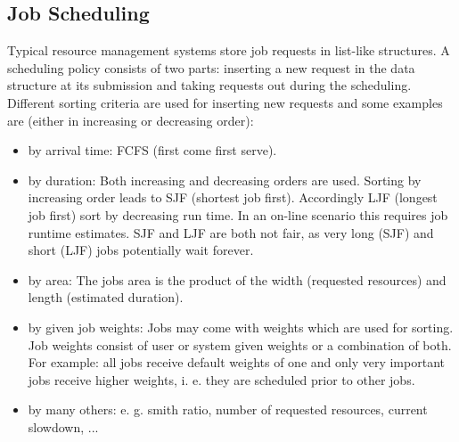 \subsection{Job Scheduling}
Typical resource management systems store job requests in list-like structures. A scheduling policy consists of two parts: inserting a new request in the data structure at its submission and taking requests out during the scheduling. Different sorting criteria are used for inserting new requests and some examples are (either in increasing or decreasing order):
\begin{itemize}
\item by arrival time: FCFS (first come first serve). 
\item by duration: Both increasing and decreasing orders are used. Sorting by increasing order leads to SJF (shortest job first). Accordingly LJF (longest job first) sort by decreasing run time. In an on-line scenario this requires job runtime estimates. SJF and LJF are both not fair, as very long (SJF) and short (LJF) jobs potentially wait forever.
\item by area: The jobs area is the product of the width (requested resources) and length (estimated duration). 
\item by given job weights: Jobs may come with weights which are used for sorting. Job weights consist of user or system given weights or a combination of both. For example: all jobs receive default weights of one and only very important jobs receive higher weights, i. e. they are scheduled prior to other jobs.
\item by many others: e. g. smith ratio, number of requested resources, current slowdown, ...
\end{itemize}

